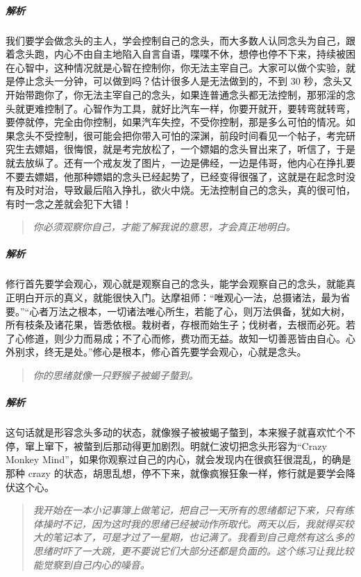 \subparagraph{解析} 我们要学会做念头的主人，学会控制自己的念头，而大多数人认同念头为自己，跟着念头跑，内心不由自主地陷入自言自语，喋喋不休，想停也停不下来，持续被困在心智中，这种情况就是心智在控制你，你无法主宰自己。大家可以做个实验，就是停止念头一分钟，可以做到吗？估计很多人是无法做到的，不到 30 秒，念头又开始带跑你了，你无法主宰自己的念头，如果连普通念头都无法控制，那邪淫的念头就更难控制了。心智作为工具，就好比汽车一样，你要开就开，要转弯就转弯，要停就停，完全由你控制，如果汽车失控，不受你控制，那是多么可怕的情况。如果念头不受控制，很可能会把你带入可怕的深渊，前段时间看见一个帖子，考完研究生去嫖娼，很悔恨，就是考完放松了，一个嫖娼的念头冒出来了，听信了，于是就去放纵了。还有一个戒友发了图片，一边是佛经，一边是伟哥，他内心在挣扎要不要去嫖娼，他那种嫖娼的念头已经起势了，已经变得很强了，这就是在起念时没有及时对治，导致最后陷入挣扎，欲火中烧。无法控制自己的念头，真的很可怕，有时一念之差就会犯下大错！

\begin{quote}\it
    你必须观察你自己，才能了解我说的意思，才会真正地明白。
\end{quote}

\subparagraph{解析} 修行首先要学会观心，观心就是观察自己的念头，能学会观察自己的念头，就能真正明白开示的真义，就能很快入门。达摩祖师：“唯观心一法，总摄诸法，最为省要。”“心者万法之根本，一切诸法唯心所生，若能了心，则万法俱备，犹如大树，所有枝条及诸花果，皆悉依根。栽树者，存根而始生子；伐树者，去根而必死。若了心修道，则少力而易成；不了心而修，费功而无益。故知一切善恶皆由自心。心外别求，终无是处。”修心是根本，修心首先要学会观心，心就是念头。

\begin{quote}\it
    你的思绪就像一只野猴子被蝎子螫到。
\end{quote}

\subparagraph{解析} 这句话就是形容念头多动的状态，就像猴子被被蝎子螫到，本来猴子就喜欢忙个不停，窜上窜下，被螫到后那动得更加剧烈。明就仁波切把念头形容为“Crazy Monkey Mind”，如果你观察过自己的内心，就会发现内在很疯狂很混乱，的确是那种 crazy 的状态，胡思乱想，停不下来，就像疯猴狂象一样，修行就是要学会降伏这个心。

\begin{quote}\it
    我开始在一本小记事簿上做笔记，把自己一天所有的思绪都记下来，只有练体操时不记，因为这时我的思绪已经被动作所取代。两天以后，我就得买较大的笔记本了，可是才过了一星期，也记满了。我看到自己竟然有这么多的思绪时吓了一大跳，更不要说它们大部分还都是负面的。这个练习让我比较能觉察到自己内心的噪音。
\end{quote}


